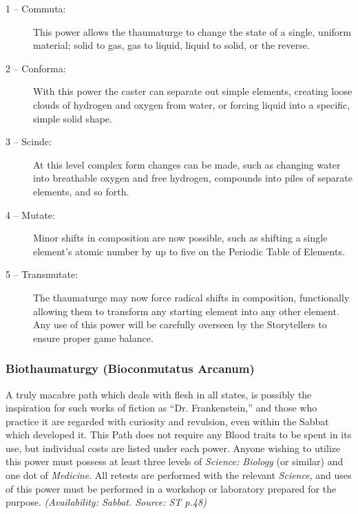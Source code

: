\begin{description}
	\item[1 -- Commuta:]  This power allows the thaumaturge to change the state of a single, uniform 
	material; solid to gas, gas to liquid, liquid to solid, or the reverse.
	\item[2 -- Conforma:]  With this power the caster can separate out simple elements, creating loose 
	clouds of hydrogen and oxygen from water, or forcing liquid into a specific, simple solid shape.
	\item[3 -- Scinde:]  At this level complex form changes can be made, such as changing water into 
	breathable oxygen and free hydrogen, compounds into piles of separate elements, and so forth.
	\item[4 -- Mutate:]  Minor shifts in composition are now possible, such as shifting a single element's 
	atomic number by up to five on the Periodic Table of Elements.
	\item[5 -- Transmutate:]  The thaumaturge may now force radical shifts in composition, functionally 
	allowing them to transform any starting element into any other element.  Any use of this power will 
	be carefully overseen by the Storytellers to ensure proper game balance.
\end{description}

\subsubsection{Biothaumaturgy (Bioconmutatus Arcanum)}
A truly macabre path which deals with flesh in all states, is possibly the inspiration for such works 
of fiction as ``Dr. Frankenstein,'' and those who practice it are regarded with curiosity and revulsion, 
even within the Sabbat which developed it.  This Path does not require any Blood traits to be spent in 
its use, but individual costs are listed under each power.  Anyone wishing to utilize this power must 
possess at least three levels of \emph{Science: Biology} (or similar) and one dot of \emph{Medicine}.  
All retests are performed with the relevant \emph{Science}, and uses of this power must be performed in 
a workshop or laboratory prepared for the purpose.  \emph{(Availability: Sabbat.  Source: ST p.48)}

